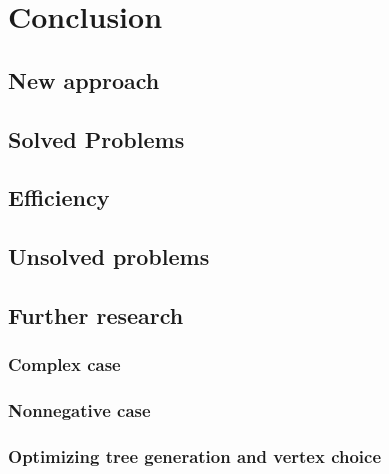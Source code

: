 \chapter{Conclusion}
\label{ch:conclusion}

\section{New approach}

\section{Solved Problems}

\section{Efficiency}

\section{Unsolved problems}

\section{Further research}

\subsection{Complex case}

\subsection{Nonnegative case}

\subsection{Optimizing tree generation and vertex choice}